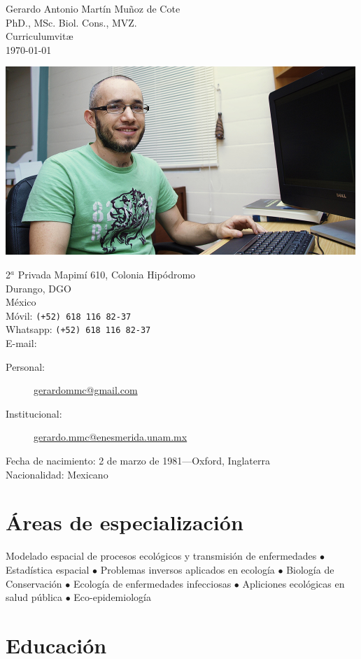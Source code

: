 \documentclass[11pt, letter]{article}
\begin{document}
{\LARGE Gerardo Antonio Mart\'in Mu\~noz de Cote \orcidA{}}\\ [0.5cm]
{\small PhD., MSc. Biol. Cons., MVZ.}\\[0.5cm]
{\large Curriculumvit\ae}\\
{\small \today}\\[0.5cm]

\begin{center}
	\includegraphics[width=.4\linewidth]{Gerardo-OHRG-1-pequena}
\end{center}
\vspace{1.5cm}

2$^a$ Privada Mapim\'i 610, Colonia Hip\'odromo\\
Durango, DGO\\
M\'exico\\[.2cm]
M\'ovil: \texttt{(+52) 618 116 82-37}\\
Whatsapp: \texttt{(+52) 618 116 82-37}\\
E-mail:
\begin{description}
	\item[Personal:] \href{mailto:gerardommc@gmail.com}{gerardommc@gmail.com}
	\item[Institucional:] \href{mailto:gerardo.mmc@enesmerida.unam.mx}{gerardo.mmc@enesmerida.unam.mx}
\end{description}
Fecha de nacimiento:  2 de marzo de 1981---Oxford, Inglaterra\\
Nacionalidad:  Mexicano

\section*{\'Areas de especializaci\'on}
Modelado espacial de procesos ecol\'ogicos y transmisi\'on de enfermedades $ \bullet $ Estad\'istica espacial $ \bullet $ Problemas inversos aplicados en ecolog\'ia $ \bullet $ Biolog\'ia de Conservaci\'on $ \bullet $ Ecolog\'ia de enfermedades infecciosas $ \bullet $ Apliciones ecol\'ogicas en salud p\'ublica $ \bullet $ Eco-epidemiolog\'ia

\section*{Educaci\'on}
\end{document}
